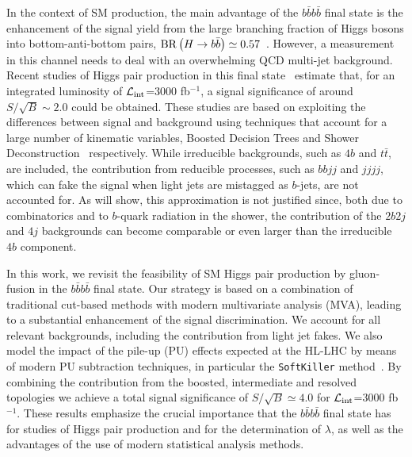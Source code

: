 In the context of SM production,
the main advantage of the $b\bar{b}b\bar{b}$ final state is the
enhancement of the signal yield
from the large branching fraction of Higgs bosons into bottom-anti-bottom
pairs, ${\rm BR}\left( H\to b\bar{b}\right)\simeq 0.57$~\cite{Dittmaier:2012vm}.
%
However, a measurement in this channel
needs to deal with an overwhelming QCD multi-jet background.
%
Recent studies of Higgs pair production in this
final state~\cite{Wardrope:2014kya,deLima:2014dta}
estimate that, for an integrated
luminosity of
$\mathcal{L}_{\rm int}$=3000 fb$^{-1}$,
a signal significance of around $S/\sqrt{B}\sim 2.0$ could be obtained.
%
These studies are
based on exploiting the differences between signal and background
using techniques that account for a large number of kinematic
variables, Boosted Decision Trees
and Shower Deconstruction~\cite{Soper:2011cr} respectively.
%
While irreducible backgrounds, such as $4b$ and
$t\bar{t}$, are included, the contribution
from reducible processes, such as $bbjj$ and
$jjjj$, which can fake the signal when 
light jets are mistagged as $b$-jets, are not accounted for.
%
As will show, this approximation is not justified since, both due to
combinatorics and to $b$-quark radiation in the shower, the
contribution of the $2b2j$ and $4j$ backgrounds can become comparable or even larger
than the irreducible $4b$ component.

In this work, we revisit the feasibility of SM Higgs pair production by gluon-fusion
in the $b\bar{b}b\bar{b}$ final state.
%
 Our strategy is based on a combination of traditional cut-based
 methods with modern multivariate analysis (MVA),
 leading to a substantial
  enhancement of the signal discrimination.
  We account for  all relevant
  backgrounds, including the contribution from light jet fakes.
  We also model the impact of the pile-up (PU) effects expected at the
  HL-LHC by means of modern PU subtraction techniques,
  in particular the {\tt SoftKiller} method~\cite{Cacciari:2014gra}.
  By combining the contribution from the boosted, intermediate and resolved
  topologies we achieve a total signal significance of $S/\sqrt{B}\simeq 4.0$
  for $\mathcal{L}_{\rm int}$=3000 fb$^{-1}$.
%
  These results emphasize the crucial importance that the $b\bar{b}b\bar{b}$ final state
  has for studies of Higgs pair production and for the determination of
  $\lambda$, as well as the advantages of the use of modern statistical
  analysis methods.
  
